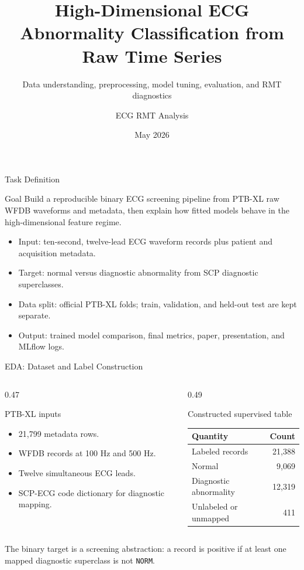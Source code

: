 \documentclass[english, xcolor=dvipsnames, aspectratio=169]{beamer}
\title{High-Dimensional ECG Abnormality Classification from Raw Time Series}
\subtitle{Data understanding, preprocessing, model tuning, evaluation, and RMT diagnostics}
\author{ECG RMT Analysis}
\date{May 2026}
\begin{document}
\begin{frame}
\titlepage
\end{frame}

\begin{frame}{Task Definition}
\begin{block}{Goal}
Build a reproducible binary ECG screening pipeline from PTB-XL raw WFDB waveforms and metadata, then explain how fitted models behave in the high-dimensional feature regime.
\end{block}
\begin{itemize}
\item Input: ten-second, twelve-lead ECG waveform records plus patient and acquisition metadata.
\item Target: normal versus diagnostic abnormality from SCP diagnostic superclasses.
\item Data split: official PTB-XL folds; train, validation, and held-out test are kept separate.
\item Output: trained model comparison, final metrics, paper, presentation, and MLflow logs.
\end{itemize}
\end{frame}

\begin{frame}{EDA: Dataset and Label Construction}
\begin{columns}[T,totalwidth=\textwidth]
\begin{column}{0.47\textwidth}
\begin{block}{PTB-XL inputs}
\begin{itemize}
\item 21,799 metadata rows.
\item WFDB records at 100 Hz and 500 Hz.
\item Twelve simultaneous ECG leads.
\item SCP-ECG code dictionary for diagnostic mapping.
\end{itemize}
\end{block}
\end{column}
\begin{column}{0.49\textwidth}
\begin{block}{Constructed supervised table}
\begin{center}
\begin{tabular}{lr}
\toprule
Quantity & Count \\
\midrule
Labeled records & 21,388 \\
Normal & 9,069 \\
Diagnostic abnormality & 12,319 \\
Unlabeled or unmapped & 411 \\
\bottomrule
\end{tabular}
\end{center}
\end{block}
\end{column}
\end{columns}
\vspace{0.15cm}
\small The binary target is a screening abstraction: a record is positive if at least one mapped diagnostic superclass is not \texttt{NORM}.
\end{frame}
\end{document}

